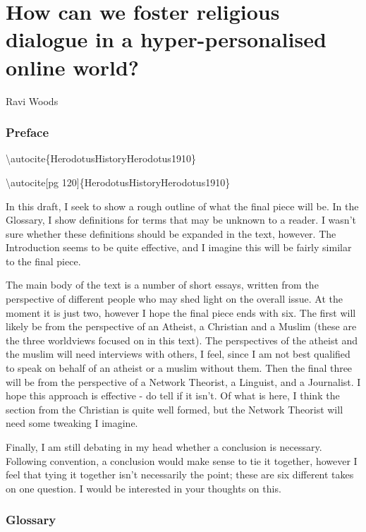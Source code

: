 \documentclass[]{article}
\date{}
\begin{document}
\hypertarget{header-n0}{%
\section{How can we foster religious dialogue in a hyper-personalised
online world?}\label{header-n0}}

Ravi Woods

\hypertarget{header-n3}{%
\subsubsection{Preface}\label{header-n3}}

\textbackslash{}autocite\{HerodotusHistoryHerodotus1910\}

\textbackslash{}autocite{[}pg 120{]}\{HerodotusHistoryHerodotus1910\}

In this draft, I seek to show a rough outline of what the final piece
will be. In the Glossary, I show definitions for terms that may be
unknown to a reader. I wasn't sure whether these definitions should be
expanded in the text, however. The Introduction seems to be quite
effective, and I imagine this will be fairly similar to the final piece.

The main body of the text is a number of short essays, written from the
perspective of different people who may shed light on the overall issue.
At the moment it is just two, however I hope the final piece ends with
six. The first will likely be from the perspective of an Atheist, a
Christian and a Muslim (these are the three worldviews focused on in
this text). The perspectives of the atheist and the muslim will need
interviews with others, I feel, since I am not best qualified to speak
on behalf of an atheist or a muslim without them. Then the final three
will be from the perspective of a Network Theorist, a Linguist, and a
Journalist. I hope this approach is effective - do tell if it isn't. Of
what is here, I think the section from the Christian is quite well
formed, but the Network Theorist will need some tweaking I imagine.

Finally, I am still debating in my head whether a conclusion is
necessary. Following convention, a conclusion would make sense to tie it
together, however I feel that tying it together isn't necessarily the
point; these are six different takes on one question. I would be
interested in your thoughts on this.

\hypertarget{header-n10}{%
\subsubsection{Glossary}\label{header-n10}}
\end{document}
